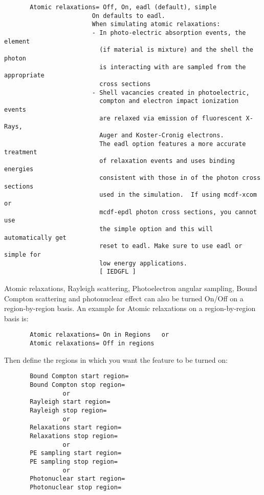 \begin{verbatim}
       Atomic relaxations= Off, On, eadl (default), simple
                        On defaults to eadl.
                        When simulating atomic relaxations:
                        - In photo-electric absorption events, the element
                          (if material is mixture) and the shell the photon
                          is interacting with are sampled from the appropriate
                          cross sections
                        - Shell vacancies created in photoelectric,
                          compton and electron impact ionization events
                          are relaxed via emission of fluorescent X-Rays,
                          Auger and Koster-Cronig electrons.
                          The eadl option features a more accurate treatment
                          of relaxation events and uses binding energies
                          consistent with those in of the photon cross sections
                          used in the simulation.  If using mcdf-xcom or
                          mcdf-epdl photon cross sections, you cannot use
                          the simple option and this will automatically get
                          reset to eadl. Make sure to use eadl or simple for
                          low energy applications.
                          [ IEDGFL ]
\end{verbatim}

\noindent
Atomic relaxations, Rayleigh scattering, Photoelectron angular sampling,
Bound Compton scattering and photonuclear effect
can also be turned On/Off on a region-by-region basis. An example for
Atomic relaxations on a region-by-region basis is:

\begin{verbatim}
       Atomic relaxations= On in Regions   or
       Atomic relaxations= Off in regions
\end{verbatim}

Then define the regions in which you want
the feature to be turned on:

\begin{verbatim}
       Bound Compton start region=
       Bound Compton stop region=
                or
       Rayleigh start region=
       Rayleigh stop region=
                or
       Relaxations start region=
       Relaxations stop region=
                or
       PE sampling start region=
       PE sampling stop region=
                or
       Photonuclear start region=
       Photonuclear stop region=
\end{verbatim}

